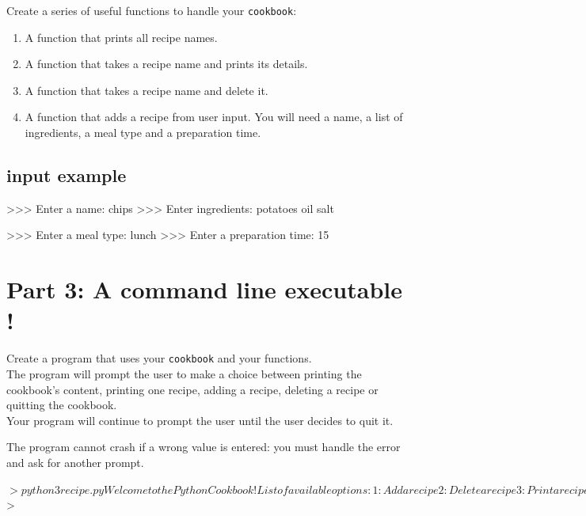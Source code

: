 \documentclass{42-en}
\begin{document}
Create a series of useful functions to handle your \texttt{cookbook}:

\begin{enumerate}
	\item A function that prints all recipe names.
	\item A function that takes a recipe name and prints its details.
	\item A function that takes a recipe name and delete it.
	\item A function that adds a recipe from user input. You will need a name, a list of ingredients, a meal type and a preparation time.
\end{enumerate}
\subsection*{input example}
\begin{42console}
>>> Enter a name:
chips
>>> Enter ingredients:
potatoes
oil
salt

>>> Enter a meal type:
lunch
>>> Enter a preparation time:
15
\end{42console}

\section*{Part 3: A command line executable !}

Create a program that uses your \texttt{cookbook} and your functions.\\

The program will prompt the user to make a choice between printing the cookbook's content, printing one recipe, adding a recipe, deleting a recipe or quitting the cookbook.\\

Your program will continue to prompt the user until the user decides to quit it. 

The program cannot crash if a wrong value is entered: you must handle the error and ask for another prompt. 

\begin{42console}
$> python3 recipe.py
Welcome to the Python Cookbook !
List of available options:
   1: Add a recipe
   2: Delete a recipe
   3: Print a recipe
   4: Print the cookbook
   5: Quit

Please select an option:
>> 3

Please enter a recipe name to get its details:
>> cake

Recipe for cake:
   Ingredients list: ['flour', 'sugar', 'eggs']
   To be eaten for dessert.
   Takes 60 minutes of cooking.

Please select an option:
>> Hello

Sorry, this option does not exist.
List of available options:
   1: Add a recipe
   2: Delete a recipe
   3: Print a recipe
   4: Print the cookbook
   5: Quit

Please select an option:
>> 5

Cookbook closed. Goodbye !
$>
\end{42console}
\end{document}
